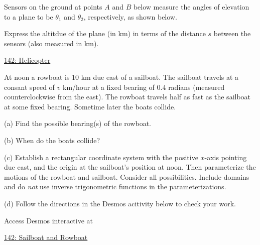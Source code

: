 \documentclass{ximera}
\begin{document}
\begin{question} \label{QddtgHHERER}
Sensors on the ground at points $A$ and $B$ below measure the angles of elevation to a plane to be $\theta_1$ and $\theta_2$, respectively, as shown below.

Express the altitdue of the plane (in km) in terms of the distance $s$ between the sensors (also measured in km).

\begin{onlineOnly}
    \begin{center}
\end{center}
\end{onlineOnly}

\href{https://www.desmos.com/calculator/zbktegkke4}{142: Helicopter}

\end{question}


\begin{question}  \label{QQQ343f44fd}
At noon a rowboat is $10$ km due east of a sailboat. The sailboat travels at a consant speed of $v$ km/hour at a fixed bearing of $0.4$ radians (measured counterclockwise from the east). The rowboat travels half as fast as the sailboat at some fixed bearing. Sometime later the boats collide.

(a) Find the possible bearing(s) of the rowboat.

(b) When do the boats collide?

(c) Establish a rectangular coordinate system with the positive $x$-axis pointing due east, and the origin at the sailboat's position at noon. Then parameterize the motions of the rowboat and sailboat. Consider all possibilities. Include domains and do \emph{not} use inverse trigonometric functions in the parameterizations.

(d) Follow the directions in the Desmos acitivity below to check your work.

 
\begin{onlineOnly}
    \begin{center}
\end{center}
\end{onlineOnly}

Access Desmos interactive at

\href{https://www.desmos.com/calculator/xjiwflhe2o}{142: Sailboat and Rowboat}

\end{question}
\end{document}
